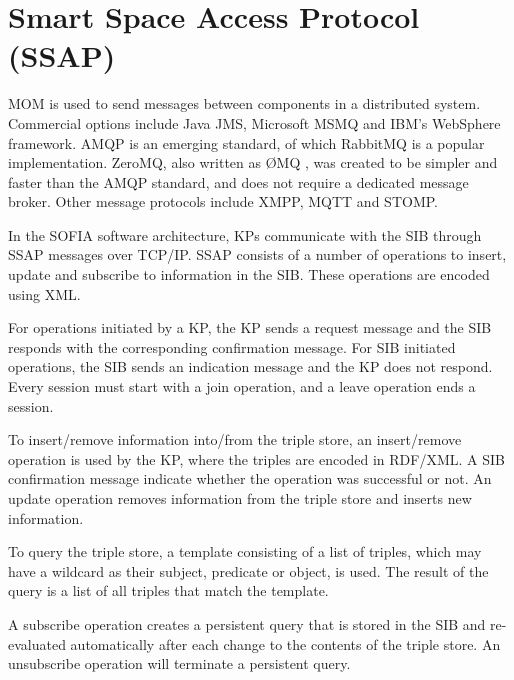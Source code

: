 


\section{Smart Space Access Protocol (SSAP)}
\label{ssap}

\ac{MOM} is used to send messages between components in a distributed system. Commercial options include Java \ac{JMS}, Microsoft \ac{MSMQ} and IBM's WebSphere framework.  \ac{AMQP} is an emerging standard, of which RabbitMQ is a popular implementation. ZeroMQ, also written as \O MQ , was created to be simpler and faster than the \ac{AMQP} standard, and does not require a dedicated message broker. Other message protocols include \ac{XMPP}, \ac{MQTT} and \ac{STOMP}.

In the \ac{SOFIA} software architecture, \acp{KP} communicate with the \ac{SIB} through \ac{SSAP} messages \cite{Honkola2010} over TCP/IP. \ac{SSAP} consists of a number of operations to insert, update and subscribe to information in the \ac{SIB}. These operations are encoded using \ac{XML}.

For operations initiated by a \ac{KP}, the \ac{KP} sends a request message and the \ac{SIB} responds with the corresponding confirmation message. For \ac{SIB} initiated operations, the \ac{SIB} sends an indication message and the \ac{KP} does not respond. Every session must start with a join operation, and a leave operation ends a session.

To insert/remove information into/from the triple store, an insert/remove operation is used by the \ac{KP}, where the triples are encoded in RDF/XML. A \ac{SIB} confirmation message indicate whether the operation was successful or not. An update operation removes information from the triple store and inserts new information.

To query the triple store, a template consisting of a list of triples, which may have a wildcard as their subject, predicate or object, is used. The result of the query is a list of all triples that match the template.

A subscribe operation creates a persistent query that is stored in the \ac{SIB} and re-evaluated automatically after each change to the contents of the triple store. An unsubscribe operation will terminate a persistent query.

